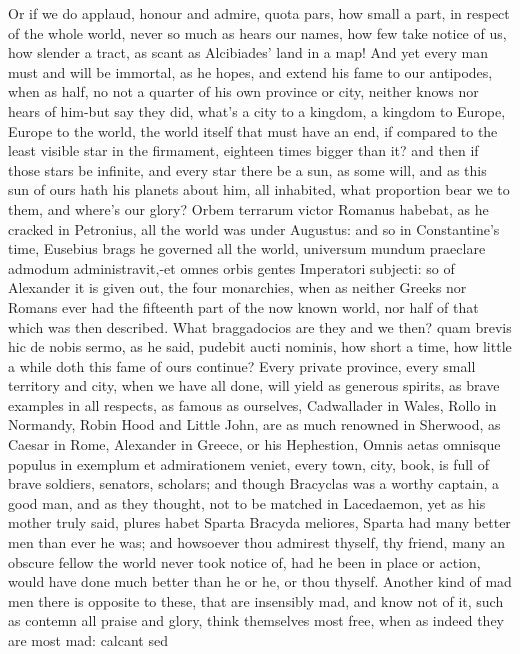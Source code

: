 {{Or if we do applaud, honour and admire, quota pars, how small a part,
in respect of the whole world, never so much as hears our names, how
few take notice of us, how slender a tract, as scant as Alcibiades'
land in a map! And yet every man must and will be immortal, as he
hopes, and extend his fame to our antipodes, when as half, no not a
quarter of his own province or city, neither knows nor hears of him-but
say they did, what's a city to a kingdom, a kingdom to Europe, Europe
to the world, the world itself that must have an end, if compared to
the least visible star in the firmament, eighteen times bigger than it?
and then if those stars be infinite, and every star there be a sun, as
some will, and as this sun of ours hath his planets about him, all
inhabited, what proportion bear we to them, and where's our glory?
Orbem terrarum victor Romanus habebat, as he cracked in Petronius, all
the world was under Augustus: and so in Constantine's time, Eusebius
brags he governed all the world, universum mundum praeclare admodum
administravit,-et omnes orbis gentes Imperatori subjecti: so of
Alexander it is given out, the four monarchies, \etc{} when as neither
Greeks nor Romans ever had the fifteenth part of the now known world,
nor half of that which was then described. What braggadocios are they
and we then? quam brevis hic de nobis sermo, as he said,
pudebit aucti nominis, how short a time, how little a while doth
this fame of ours continue? Every private province, every small
territory and city, when we have all done, will yield as generous
spirits, as brave examples in all respects, as famous as ourselves,
Cadwallader in Wales, Rollo in Normandy, Robin Hood and Little John,
are as much renowned in Sherwood, as Caesar in Rome, Alexander in
Greece, or his Hephestion,  Omnis aetas omnisque populus in
exemplum et admirationem veniet, every town, city, book, is full of
brave soldiers, senators, scholars; and though Bracyclas was a
worthy captain, a good man, and as they thought, not to be matched in
Lacedaemon, yet as his mother truly said, plures habet Sparta Bracyda
meliores, Sparta had many better men than ever he was; and howsoever
thou admirest thyself, thy friend, many an obscure fellow the world
never took notice of, had he been in place or action, would have done
much better than he or he, or thou thyself.
Another kind of mad men there is opposite to these, that are insensibly
mad, and know not of it, such as contemn all praise and glory, think
themselves most free, when as indeed they are most mad: calcant sed
}}
